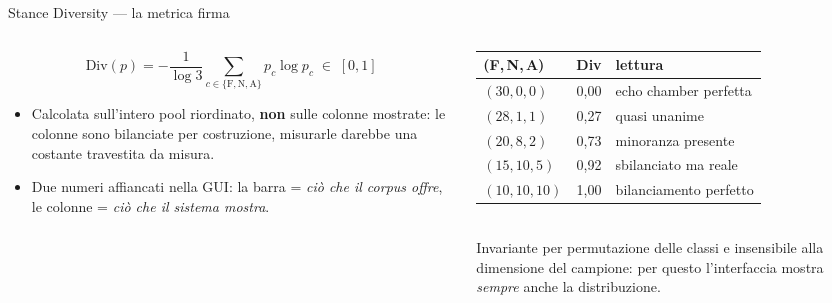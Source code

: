 \documentclass[aspectratio=169,11pt]{beamer}
\begin{document}
\begin{frame}{Stance Diversity --- la metrica firma}
  \begin{columns}[T]
    \begin{column}{0.52\textwidth}
      \small
      \[
        \text{Div}(p) = -\frac{1}{\log 3}\!\!\sum_{c \in \{\text{F},\text{N},\text{A}\}}\!\! p_c \log p_c \;\in\; [0,1]
      \]
      \vspace{-0.4em}
      \begin{itemize}\footnotesize
        \item Calcolata sull'\alert{intero pool} riordinato, \textbf{non} sulle colonne
              mostrate: le colonne sono bilanciate per costruzione, misurarle darebbe
              una costante travestita da misura.
        \item Due numeri affiancati nella GUI: la barra = \emph{ciò che il corpus offre},
              le colonne = \emph{ciò che il sistema mostra}.
      \end{itemize}
    \end{column}
    \begin{column}{0.48\textwidth}
      \centering\scriptsize
      \begin{tabular}{lcl}
        \toprule
        (F,\,N,\,A) & Div & lettura \\
        \midrule
        $(30,0,0)$   & 0,00 & echo chamber perfetta \\
        $(28,1,1)$   & 0,27 & quasi unanime \\
        $(20,8,2)$   & 0,73 & minoranza presente \\
        $(15,10,5)$  & 0,92 & sbilanciato ma reale \\
        $(10,10,10)$ & 1,00 & bilanciamento perfetto \\
        \bottomrule
      \end{tabular}\\[0.5em]
      \footnotesize\color{echoslate}
      Invariante per permutazione delle classi e insensibile alla dimensione del
      campione: per questo l'interfaccia mostra \emph{sempre} anche la distribuzione.
    \end{column}
  \end{columns}
\end{frame}
\end{document}
